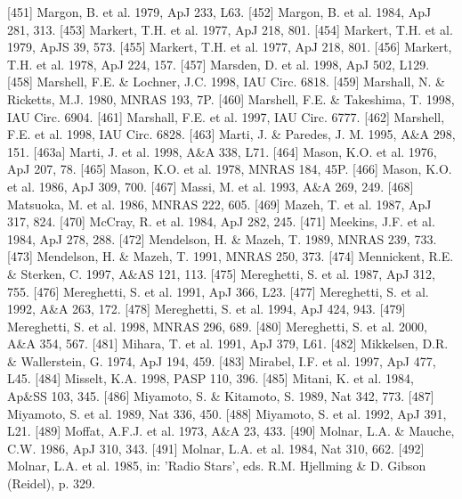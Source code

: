 \documentclass{aa}
\begin{document}
\begin{thebibliography}{}
\bibitem[]{}[451] Margon, B. et al. 1979, ApJ 233, L63.
\bibitem[]{}[452] Margon, B. et al. 1984, ApJ 281, 313.
\bibitem[]{}[453] Markert, T.H. et al. 1977, ApJ 218, 801.
\bibitem[]{}[454] Markert, T.H. et al. 1979, ApJS 39, 573.
\bibitem[]{}[455] Markert, T.H. et al. 1977, ApJ 218, 801.
\bibitem[]{}[456] Markert, T.H. et al. 1978, ApJ 224, 157.
\bibitem[]{}[457] Marsden, D. et al. 1998, ApJ 502, L129.
\bibitem[]{}[458] Marshell, F.E. \& Lochner, J.C. 1998, IAU Circ. 6818.
\bibitem[]{}[459] Marshall, N. \& Ricketts, M.J. 1980, MNRAS 193, 7P.
\bibitem[]{}[460] Marshell, F.E. \& Takeshima, T. 1998, IAU Circ. 6904.
\bibitem[]{}[461] Marshall, F.E. et al. 1997, IAU Circ. 6777.
\bibitem[]{}[462] Marshell, F.E. et al. 1998, IAU Circ. 6828.
\bibitem[]{}[463] Marti, J. \& Paredes, J. M. 1995, A\&A 298, 151.
\bibitem[]{}[463a] Marti, J. et al. 1998, A\&A 338, L71.
\bibitem[]{}[464] Mason, K.O. et al. 1976, ApJ 207, 78.
\bibitem[]{}[465] Mason, K.O. et al. 1978, MNRAS 184, 45P.
\bibitem[]{}[466] Mason, K.O. et al. 1986, ApJ 309, 700.
\bibitem[]{}[467] Massi, M. et al. 1993, A\&A 269, 249.
\bibitem[]{}[468] Matsuoka, M. et al. 1986, MNRAS 222, 605.
\bibitem[]{}[469] Mazeh, T. et al. 1987, ApJ 317, 824.
\bibitem[]{}[470] McCray, R. et al. 1984, ApJ 282, 245.
\bibitem[]{}[471] Meekins, J.F. et al. 1984, ApJ 278, 288.
\bibitem[]{}[472] Mendelson, H. \& Mazeh, T. 1989, MNRAS 239, 733.
\bibitem[]{}[473] Mendelson, H. \& Mazeh, T. 1991, MNRAS 250, 373.
\bibitem[]{}[474] Mennickent, R.E. \& Sterken, C. 1997, A\&AS 121, 113.
\bibitem[]{}[475] Mereghetti, S. et al. 1987, ApJ 312, 755.
\bibitem[]{}[476] Mereghetti, S. et al. 1991, ApJ 366, L23.
\bibitem[]{}[477] Mereghetti, S. et al. 1992, A\&A 263, 172.
\bibitem[]{}[478] Mereghetti, S. et al. 1994, ApJ 424, 943. 
\bibitem[]{}[479] Mereghetti, S. et al. 1998, MNRAS 296, 689.
\bibitem[]{}[480] Mereghetti, S. et al. 2000, A\&A 354, 567.
\bibitem[]{}[481] Mihara, T. et al. 1991, ApJ 379, L61.
\bibitem[]{}[482] Mikkelsen, D.R. \& Wallerstein, G. 1974, ApJ 194, 459.
\bibitem[]{}[483] Mirabel, I.F. et al. 1997, ApJ 477, L45. 
\bibitem[]{}[484] Misselt, K.A. 1998, PASP 110, 396.
\bibitem[]{}[485] Mitani, K. et al. 1984, Ap\&SS 103, 345.
\bibitem[]{}[486] Miyamoto, S. \& Kitamoto, S. 1989, Nat 342, 773.
\bibitem[]{}[487] Miyamoto, S. et al. 1989, Nat 336, 450.
\bibitem[]{}[488] Miyamoto, S. et al. 1992, ApJ 391, L21.
\bibitem[]{}[489] Moffat, A.F.J. et al. 1973, A\&A 23, 433.
\bibitem[]{}[490] Molnar, L.A. \& Mauche, C.W. 1986, ApJ 310, 343.
\bibitem[]{}[491] Molnar, L.A. et al. 1984, Nat 310, 662.
\bibitem[]{}[492] Molnar, L.A. et al. 1985, in: 'Radio Stars', eds. R.M. Hjellming \& D. Gibson (Reidel), p. 329.

\end{thebibliography}
\end{document}
